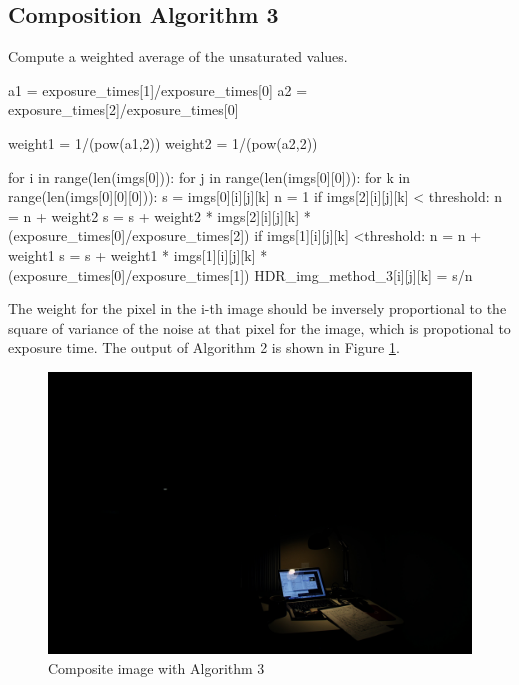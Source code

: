 \documentclass[10pt,twocolumn,letterpaper]{article}
\begin{document}
\subsection{Composition Algorithm 3}
Compute a weighted average of the unsaturated values. \\
\begin{python} 
a1 = exposure_times[1]/exposure_times[0]
a2 = exposure_times[2]/exposure_times[0]

weight1 = 1/(pow(a1,2))
weight2 = 1/(pow(a2,2))

for i in  range(len(imgs[0])):
	for j in range(len(imgs[0][0])):
		for k in range(len(imgs[0][0][0])):
			s = imgs[0][i][j][k] 
			n = 1
			if imgs[2][i][j][k] < threshold:
				n = n + weight2
				s = s + weight2 * imgs[2][i][j][k] 
				* (exposure_times[0]/exposure_times[2])
			if imgs[1][i][j][k] <threshold:
				n = n + weight1
				s = s + weight1 * imgs[1][i][j][k] 
				* (exposure_times[0]/exposure_times[1])
			HDR_img_method_3[i][j][k] = s/n
\end{python}

The weight for the pixel in the i-th image should be inversely proportional to the square of variance of the noise at that pixel for the image, which is propotional to exposure time. The output of Algorithm 2 is shown in Figure \ref{fig:HDR_img_method_3}.

\begin{figure}[bhp]
\includegraphics[width=\columnwidth]{images/hdr/combined/HDR_img_method_3}
\caption{Composite image with Algorithm 3}

\label{fig:HDR_img_method_3}
\end{figure}
\end{document}
